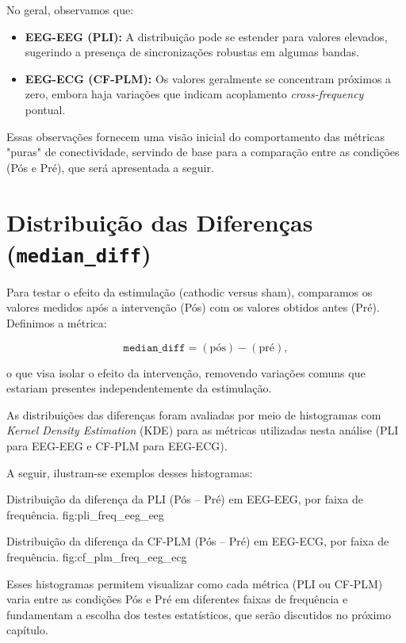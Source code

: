 No geral, observamos que:
\begin{itemize}
    \item \textbf{EEG-EEG (PLI):} A distribuição pode se estender para valores elevados, sugerindo a presença de sincronizações robustas em algumas bandas.
    \item \textbf{EEG-ECG (CF-PLM):} Os valores geralmente se concentram próximos a zero, embora haja variações que indicam acoplamento \emph{cross-frequency} pontual.
\end{itemize}

Essas observações fornecem uma visão inicial do comportamento das métricas "puras" de conectividade, servindo de base para a comparação entre as condições (Pós e Pré), que será apresentada a seguir.

\section{Distribuição das Diferenças (\texttt{median\_diff})}

Para testar o efeito da estimulação (cathodic versus sham), comparamos os valores medidos após a intervenção (Pós) com os valores obtidos antes (Pré). Definimos a métrica:

\[
\texttt{median\_diff} = (\text{pós}) - (\text{pré}),
\]

o que visa isolar o efeito da intervenção, removendo variações comuns que estariam presentes independentemente da estimulação.

As distribuições das diferenças foram avaliadas por meio de histogramas com \emph{Kernel Density Estimation} (KDE) para as métricas utilizadas nesta análise (PLI para EEG-EEG e CF-PLM para EEG-ECG).

A seguir, ilustram-se exemplos desses histogramas:

{Distribuição da diferença da PLI (Pós -- Pré) em EEG-EEG, por faixa de frequência.}
{fig:pli_freq_eeg_eeg}

{Distribuição da diferença da CF-PLM (Pós -- Pré) em EEG-ECG, por faixa de frequência.}
{fig:cf_plm_freq_eeg_ecg}

Esses histogramas permitem visualizar como cada métrica (PLI ou CF-PLM) varia entre as condições Pós e Pré em diferentes faixas de frequência e fundamentam a escolha dos testes estatísticos, que serão discutidos no próximo capítulo.
